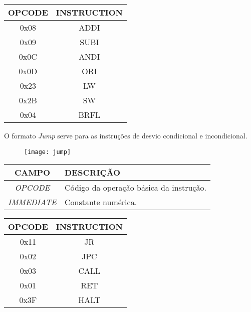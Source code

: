 \begin{table}[H]
\centering	
\begin{tabular}{|c|c|}
	\hline 
  	\cellcolor[gray]{0.9}\textbf{OPCODE} & \cellcolor[gray]{0.9}\textbf{INSTRUCTION} \\ 
	\hline 
	0x08 & ADDI \\ 
	\hline 
	0x09 & SUBI \\ 
	\hline 
	0x0C & ANDI \\ 
	\hline 
	0x0D & ORI \\ 
	\hline
	0x23 & LW \\ 
	\hline 
	0x2B & SW \\
	\hline
	0x04 & BRFL \\ 
  	\hline 
	\end{tabular} 
\end{table}	
	
 O formato \textit{Jump} serve para as instruções de desvio condicional e incondicional. 
 	
   	\begin{figure}[H]
    	\centering
    	\texttt{[image: jump]}
		\label{jump}
  	\end{figure}
  	
\begin{table}[H]
\centering	
\begin{tabular}{|c|l|}
	\hline 
	\cellcolor[gray]{0.9}\textbf{CAMPO} & \cellcolor[gray]{0.9}\textbf{DESCRIÇÃO} \\ 
	\hline 
	\textit{OPCODE} & Código da operação básica da instrução. \\ 
	\hline 
	\textit{IMMEDIATE} & Constante numérica. \\ 
	\hline 
	\end{tabular} 
	\end{table}
 
\begin{table}[H]
\centering 	
  	\begin{tabular}{|c|c|}
  	\hline 
  	\cellcolor[gray]{0.9}\textbf{OPCODE} & \cellcolor[gray]{0.9}\textbf{INSTRUCTION} \\ 
  	\hline 
  	0x11 & JR \\ 
  	\hline 
  	0x02 & JPC \\ 
  	\hline 
  	0x03 & CALL \\ 
  	\hline 
  	0x01 & RET \\ 
  	\hline 
  	0x3F & HALT \\ 
  	\hline 
  	\end{tabular} 
\end{table}